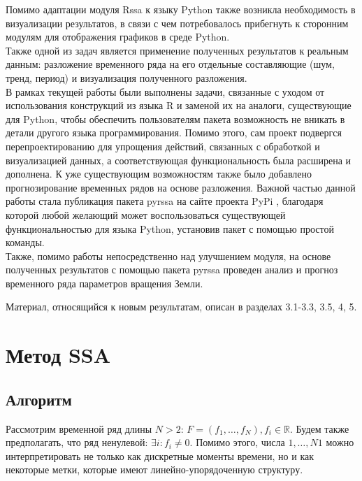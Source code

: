 \documentclass[specialist,
			   substylefile = spbu_report.rtx,
			   subf,href,colorlinks=true, 12pt]{disser}
\begin{document}
Помимо адаптации модуля Rssa к языку Python также возникла необходимость в визуализации результатов, в связи с чем потребовалось прибегнуть к сторонним модулям для отображения графиков в среде Python.\\

Также одной из задач является применение полученных результатов к реальным данным: разложение временного ряда на его отдельные составляющие (шум, тренд, период) и визуализация полученного разложения.\\

В рамках текущей работы были выполнены задачи, связанные с уходом от использования конструкций из языка R и заменой их на аналоги, существующие для Python, чтобы обеспечить пользователям пакета возможность не вникать в детали другого языка программирования. Помимо этого, сам проект подвергся перепроектированию для упрощения действий, связанных с обработкой и визуализацией данных, а соответствующая функциональность была расширена и дополнена. К уже существующим возможностям также было добавлено прогнозирование временных рядов на основе разложения. Важной частью данной работы стала публикация пакета pyrssa на сайте проекта PyPi \cite{pypi-org}, благодаря которой любой желающий может воспользоваться существующей функциональностью для языка Python, установив пакет с помощью простой команды.\\

Также, помимо работы непосредственно над улучшением модуля, на основе полученных результатов с помощью пакета pyrssa проведен анализ и прогноз временного ряда параметров вращения Земли.

Материал, относящийся к новым результатам, описан в разделах 3.1-3.3, 3.5, 4, 5.

\chapter{Метод SSA}

\section{Алгоритм}

Рассмотрим временной ряд длины $N > 2$: $F = (f_1, \dots, f_{N}), f_i \in \mathbb{R}$. Будем также предполагать, что ряд ненулевой: $\exists  i: f_i \neq 0$. Помимо этого, числа $1, \dots, N1$ можно интерпретировать не только как дискретные моменты времени, но и как некоторые метки, которые имеют линейно-упорядоченную структуру.\\
\end{document}
